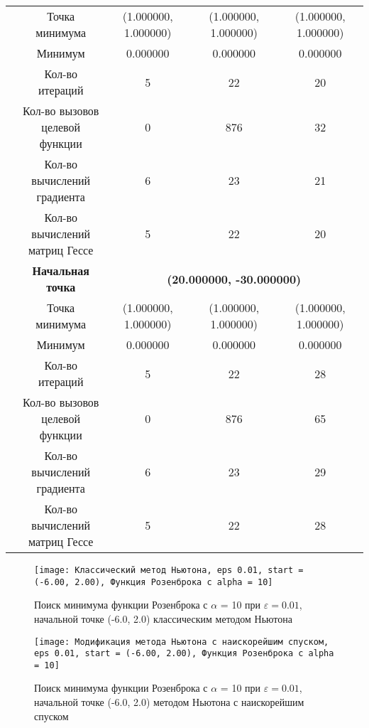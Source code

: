 \begin{table}[H]
\begin{tabular}{|c|c|c|c|c|}
	\cline{2-5}
	&Точка минимума &(1.000000, 1.000000) &(1.000000, 1.000000) &(1.000000, 1.000000) \\ 
	\cline{2-5}
	&Минимум &0.000000 &0.000000 &0.000000 \\ 
	\cline{2-5}
	&Кол-во итераций &5 &22 &20 \\ 
	\cline{2-5}
	&\makecell{Кол-во вызовов\\целевой функции} &0 &876 &32 \\ 
	\cline{2-5}
	&\makecell{Кол-во вычислений\\градиента} &6 &23 &21 \\ 
	\cline{2-5}
	&\makecell{Кол-во вычислений\\матриц Гессе} &5 &22 &20 \\ 
	\cline{2-5}
\cline{2-5}&\textbf{Начальная точка} &\multicolumn{3}{c|}{\textbf{(20.000000, -30.000000)}}\\
	\cline{2-5}
	&Точка минимума &(1.000000, 1.000000) &(1.000000, 1.000000) &(1.000000, 1.000000) \\ 
	\cline{2-5}
	&Минимум &0.000000 &0.000000 &0.000000 \\ 
	\cline{2-5}
	&Кол-во итераций &5 &22 &28 \\ 
	\cline{2-5}
	&\makecell{Кол-во вызовов\\целевой функции} &0 &876 &65 \\ 
	\cline{2-5}
	&\makecell{Кол-во вычислений\\градиента} &6 &23 &29 \\ 
	\cline{2-5}
	&\makecell{Кол-во вычислений\\матриц Гессе} &5 &22 &28 \\ 
	\cline{2-5}
	\hline

\end{tabular}
\end{table}


            \begin{figure}[H]
	        \centering
	        \texttt{[image: Классический метод Ньютона, eps 0.01, start = (-6.00, 2.00), Функция Розенброка с alpha = 10]}%
	        \caption{Поиск минимума функции Розенброка с $\alpha$ = 10 при $\varepsilon = 0.01$, начальной точке (-6.0, 2.0) классическим методом Ньютона}
	        \vspace*{-1.2cm}
            \end{figure}
            
            \begin{figure}[H]
	        \centering
	        \texttt{[image: Модификация метода Ньютона с наискорейшим спуском, eps 0.01, start = (-6.00, 2.00), Функция Розенброка с alpha = 10]}%
	        \caption{Поиск минимума функции Розенброка с $\alpha$ = 10 при $\varepsilon = 0.01$, начальной точке (-6.0, 2.0) методом Ньютона с наискорейшим спуском}
	        \vspace*{-1.2cm}
            \end{figure}
            

